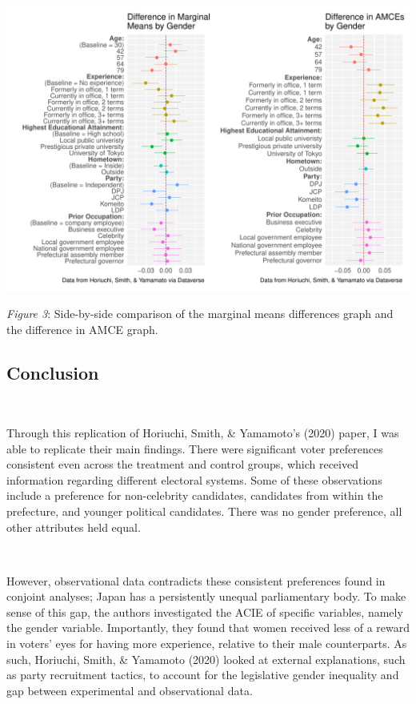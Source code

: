 \documentclass[
]{article}
\begin{document}
\includegraphics{milestone_8_files/figure-latex/display_3-1.pdf}

\emph{Figure 3}: Side-by-side comparison of the marginal means differences graph and the difference in AMCE graph.

\hypertarget{conclusion}{%
\subsection{Conclusion}\label{conclusion}}

~

Through this replication of Horiuchi, Smith, \& Yamamoto's (2020) paper, I was able to replicate their main findings. There were significant voter preferences consistent even across the treatment and control groups, which received information regarding different electoral systems. Some of these observations include a preference for non-celebrity candidates, candidates from within the prefecture, and younger political candidates. There was no gender preference, all other attributes held equal.

~

However, observational data contradicts these consistent preferences found in conjoint analyses; Japan has a persistently unequal parliamentary body. To make sense of this gap, the authors investigated the ACIE of specific variables, namely the gender variable. Importantly, they found that women received less of a reward in voters' eyes for having more experience, relative to their male counterparts. As such, Horiuchi, Smith, \& Yamamoto (2020) looked at external explanations, such as party recruitment tactics, to account for the legislative gender inequality and gap between experimental and observational data.
\end{document}
